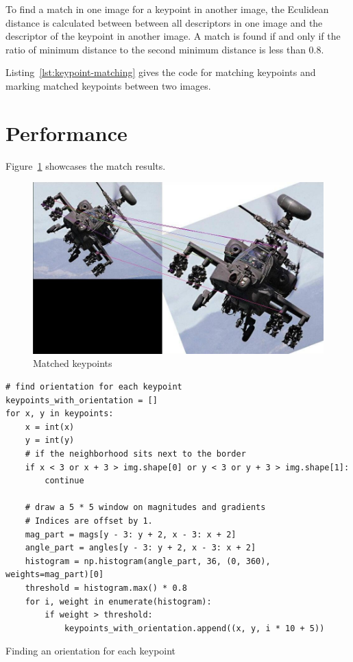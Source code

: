\documentclass{ee208report}
\begin{document}
\begin{multicols*}{2}
To find a match in one image for a keypoint in another image, the Eculidean
distance is calculated between between all descriptors in one image and the
descriptor of the keypoint in another image. A match is found if and only if the
ratio of minimum distance to the second minimum distance is less than 0.8.

Listing~\ref{lst:keypoint-matching} gives the code for matching keypoints and
marking matched keypoints between two images.

\section{Performance}

Figure~\ref{fig:match-results} showcases the match results.

\begin{figure}[H]
    \includegraphics[width=\linewidth]{images/match_results.jpg}
    \caption{Matched keypoints}
    \label{fig:match-results}
\end{figure}




\end{multicols*}

\begin{listing}
    \begin{verbatim}
# find orientation for each keypoint
keypoints_with_orientation = []
for x, y in keypoints:
    x = int(x)
    y = int(y)
    # if the neighborhood sits next to the border
    if x < 3 or x + 3 > img.shape[0] or y < 3 or y + 3 > img.shape[1]:
        continue

    # draw a 5 * 5 window on magnitudes and gradients
    # Indices are offset by 1.
    mag_part = mags[y - 3: y + 2, x - 3: x + 2]
    angle_part = angles[y - 3: y + 2, x - 3: x + 2]
    histogram = np.histogram(angle_part, 36, (0, 360), weights=mag_part)[0]
    threshold = histogram.max() * 0.8
    for i, weight in enumerate(histogram):
        if weight > threshold:
            keypoints_with_orientation.append((x, y, i * 10 + 5))
    \end{verbatim}
    \caption{Finding an orientation for each keypoint}
    \label{lst:keypoint-orientation}
\end{listing}
\end{document}

